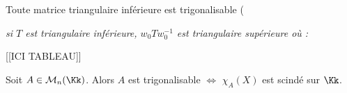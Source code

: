 \documentclass[class=report,crop=false]{standalone}
\begin{document}
\begin{exercicecours}
Toute matrice triangulaire inférieure est trigonalisable ({\it si $T$ est triangulaire inférieure, $w_0Tw_0^{-1}$ est triangulaire supérieure où : 

[[ICI TABLEAU]]


}
\end{exercicecours}
\begin{theoreme}
Soit $A \in \mathcal{M}_n(\Kk)$. Alors $A$ est trigonalisable $\iff$ $\chi_A(X)$ est scindé sur $\Kk$.
\end{theoreme}
\end{document}
